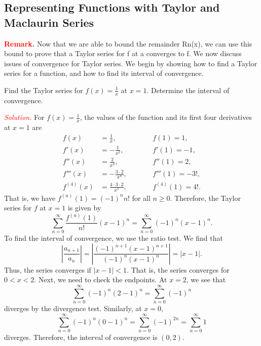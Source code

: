 \documentclass{report}
\begin{document}
    \subsection*{Representing Functions with Taylor and Maclaurin Series}
    \bigbreak \noindent 
    \textbf{\textcolor{red}{Remark.}} Now that we are able to bound the remainder Rn(x), we can use this bound to prove that a Taylor series for f at a converges to f.
    \bigbreak \noindent 
    We now discuss issues of convergence for Taylor series. We begin by showing how to find a Taylor series for a function, and how to find its interval of convergence.
    \begin{exm}
        Find the Taylor series for  $f(x) = \frac{1}{x} $ at  $x=1$. Determine the interval of convergence.
    \end{exm}
    \bigbreak \noindent 
    \textcolor{red}{\textit{Solution.}}
    For $f(x) = \frac{1}{x}$, the values of the function and its first four derivatives at $x=1$ are
    \[
    \begin{alignedat}{2}
        f(x) &= \frac{1}{x}, \quad \quad &&f(1) = 1, \\
        f'(x) &= -\frac{1}{x^2}, \quad \quad &&f'(1) = -1, \\
        f''(x) &= \frac{2}{x^3}, \quad \quad &&f''(1) = 2, \\
        f'''(x) &= -\frac{3 \cdot 2}{x^4}, \quad \quad &&f'''(1) = -3!, \\
        f^{(4)}(x) &= \frac{4 \cdot 3 \cdot 2}{x^5}, \quad \quad &&f^{(4)}(1) = 4!.
    \end{alignedat}
    \]
    That is, we have $f^{(n)}(1) = (-1)^n n!$ for all $n \geq 0$. Therefore, the Taylor series for $f$ at $x=1$ is given by
    \[
    \sum_{n=0}^{\infty} \frac{f^{(n)}(1)}{n!}(x-1)^n = \sum_{n=0}^{\infty} (-1)^n (x-1)^n.
    \]
    To find the interval of convergence, we use the ratio test. We find that
    \[
    \left| \frac{a_{n+1}}{a_n} \right| = \left| \frac{(-1)^{n+1}(x-1)^{n+1}}{(-1)^n(x-1)^n} \right| = |x-1|.
    \]
    Thus, the series converges if $|x-1| < 1$. That is, the series converges for $0 < x < 2$. Next, we need to check the endpoints. At $x=2$, we see that
    \[
    \sum_{n=0}^{\infty} (-1)^n (2-1)^n = \sum_{n=0}^{\infty} (-1)^n
    \]
    diverges by the divergence test. Similarly, at $x=0$,
    \[
    \sum_{n=0}^{\infty} (-1)^n (0-1)^n = \sum_{n=0}^{\infty} (-1)^{2n} = \sum_{n=0}^{\infty} 1
    \]
    diverges. Therefore, the interval of convergence is $(0,2)$.
\end{document}
